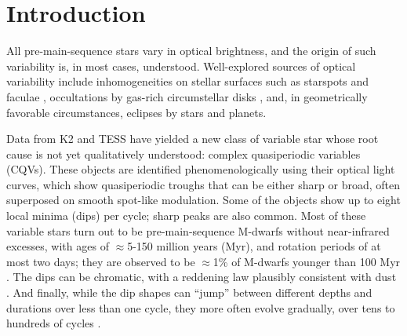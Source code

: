 \documentclass[11pt,twocolumn,tighten]{aastex63}
\begin{document}

\section{Introduction}
\label{sec:intro}

All pre-main-sequence stars vary in optical brightness, and the origin
of such variability is, in most cases, understood.  Well-explored
sources of optical variability include inhomogeneities on stellar
surfaces such as starspots and faculae \citep{2021isma.book.....B},
occultations by gas-rich circumstellar disks
\citep{2017MNRAS.470..202B}, and, in geometrically favorable
circumstances, eclipses by stars and planets.

Data from K2 and TESS have yielded a new class of variable star whose
root cause is not yet qualitatively understood: complex quasiperiodic
variables (CQVs).  These objects are identified phenomenologically
using their optical light curves, which show quasiperiodic troughs
that can be either sharp or broad, often superposed on smooth
spot-like modulation.  Some of the objects show up to eight local
minima (dips) per cycle; sharp peaks are also common.  Most of these
variable stars turn out to be pre-main-sequence M-dwarfs without
near-infrared excesses, with ages of $\approx$5-150 million years
(Myr), and rotation periods of at most two days; they are observed to
be $\approx$1\% of M-dwarfs younger than 100 Myr
\citep{2017AJ....153..152S,2018AJ....155...63S,2019ApJ...876..127Z,2022AJ....163..144G}.
The dips can be chromatic, with a reddening law plausibly consistent
with dust
\citep{2020AJ....160...86B,2022AJ....163..144G,2023MNRAS.518.2921K}.
And finally, while the dip shapes can ``jump'' between different
depths and durations over less than one cycle, they more often evolve
gradually, over tens to hundreds of cycles
\citep[e.g.][]{2017AJ....153..152S,2022ApJ...925...75P,2023ApJ...945..114P}.
\end{document}

